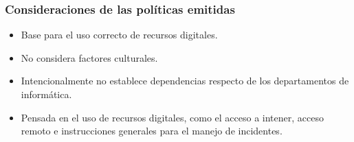 \documentclass{beamer}
\begin{document}
\begin{frame}[c,fragile]
	\frametitle{Consideraciones de las políticas emitidas}
	\begin{itemize}
		\item Base para el uso correcto de recursos digitales.
		\item No considera factores culturales.
		\item Intencionalmente no establece dependencias respecto de los departamentos de informática.
		\item Pensada en el uso de recursos digitales, como el acceso a intener, acceso remoto e instrucciones generales para el manejo de incidentes.
	\end{itemize}
\end{frame}


\begin{frame}
	\titlepage
  \end{frame}
\end{document}
